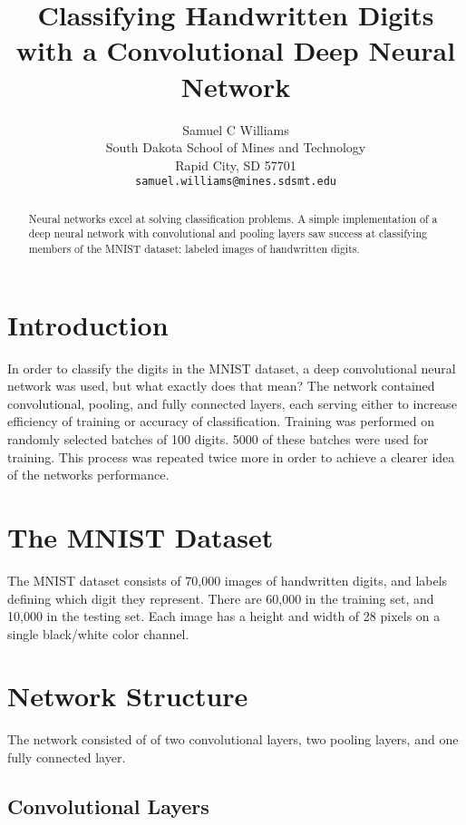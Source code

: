 \documentclass{article}
\title{Classifying Handwritten Digits with a Convolutional Deep Neural Network}
\author{
  Samuel C Williams\\
  South Dakota School of Mines and Technology\\
  Rapid City, SD 57701 \\
  \texttt{samuel.williams@mines.sdsmt.edu} \\
}
\begin{document}

\maketitle

\begin{abstract}
  Neural networks excel at solving classification problems. A simple implementation of a deep neural network with convolutional and pooling layers saw success at classifying members of the MNIST dataset: labeled images of handwritten digits.
\end{abstract}

\section{Introduction}

In order to classify the digits in the MNIST dataset, a deep convolutional neural network was used, but what exactly does that mean? The network contained convolutional, pooling, and fully connected layers, each serving either to increase efficiency of training or accuracy of classification. Training was performed on randomly selected batches of 100 digits. 5000 of these batches were used for training. This process was repeated twice more in order to achieve a clearer idea of the networks performance.

\section{The MNIST Dataset}

The MNIST dataset consists of 70,000 images of handwritten digits, and labels defining which digit they represent. There are 60,000 in the training set, and 10,000 in the testing set. Each image has a height and width of 28 pixels on a single black/white color channel.

\section{Network Structure}

The network consisted of of two convolutional layers, two pooling layers, and one fully connected layer.

\subsection{Convolutional Layers}
\end{document}
